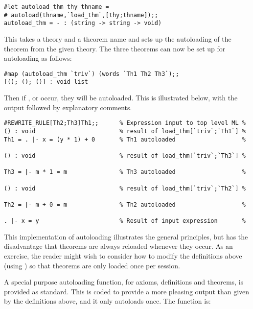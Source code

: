 \begin{session}\begin{verbatim}
#let autoload_thm thy thname = 
# autoload(thname,`load_thm`,[thy;thname]);;
autoload_thm = - : (string -> string -> void)
\end{verbatim}\end{session}

\noindent This takes a theory and a theorem name and sets up the autoloading
of the theorem from the given theory. The three theorems can now be set up for
autoloading as follows:

\begin{session}\begin{verbatim}
#map (autoload_thm `triv`) (words `Th1 Th2 Th3`);;
[(); (); ()] : void list
\end{verbatim}\end{session}

\noindent Then if ,  or  occur, they will be
autoloaded.  This is illustrated below, with the output followed by
explanatory comments.

\begin{session}\begin{verbatim}
#REWRITE_RULE[Th2;Th3]Th1;;      % Expression input to top level ML %
() : void                        % result of load_thm[`triv`;`Th1`] %
Th1 = . |- x = (y * 1) + 0       % Th1 autoloaded                   %

() : void                        % result of load_thm[`triv`;`Th3`] %

Th3 = |- m * 1 = m               % Th3 autoloaded                   %

() : void                        % result of load_thm[`triv`;`Th2`] %

Th2 = |- m + 0 = m               % Th2 autoloaded                   %

. |- x = y                       % Result of input expression       %
\end{verbatim}\end{session}

This implementation of autoloading illustrates the general principles, but has
the disadvantage that theorems are always reloaded whenever they occur. As an
exercise, the reader might wish to consider how to modify the definitions above
(using ) so that theorems are only loaded once per session.

A special purpose autoloading function, for axioms, definitions and theorems,
is provided as standard. This is coded to provide a more pleasing output than
given by the definitions above, and it only autoloads once. The function is:

